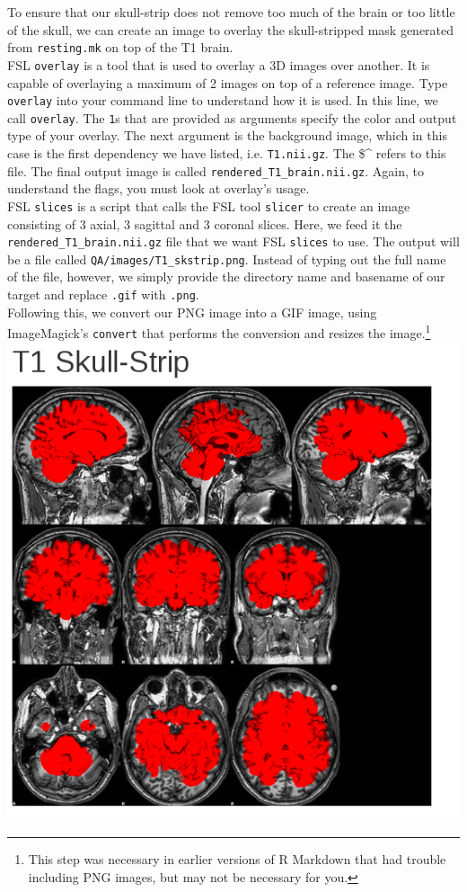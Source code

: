 To ensure that our skull-strip does not remove too much of the brain or too little of the skull, we can create an image to overlay the skull-stripped mask generated from \texttt{resting.mk} on top of the T1 brain. \\
\tab{} FSL \texttt{overlay} is a tool that is used to overlay a 3D images over another. It is capable of overlaying a maximum of 2 images on top of a reference image. Type \texttt{overlay} into your command line to understand how it is used. In this line, we call \texttt{overlay}. The \texttt{1}s that are provided as arguments specify the color and output type of your overlay. The next argument is the background image, which in this case is the first dependency we have listed, i.e. \texttt{T1.nii.gz}. The \$\textasciicircum{} refers to this file. The final output image is called \texttt{rendered\_T1\_brain.nii.gz}. Again, to understand the flags, you must look at overlay's usage. \\
 FSL \texttt{slices} is a script that calls the FSL tool \texttt{slicer} to create an image consisting of 3 axial, 3 sagittal and 3 coronal slices. Here, we feed it the \texttt{rendered\_T1\_brain.nii.gz} file that we want FSL \texttt{slices} to use. The output will be a file called \texttt{QA/images/T1\_skstrip.png}. Instead of typing out the full name of the file, however, we simply provide the directory name and basename of our target and replace \texttt{.gif} with \texttt{.png}. \\
 Following this, we convert our PNG image into a GIF image, using ImageMagick's \texttt{convert} that performs the conversion and resizes the image.\footnote{This step was necessary in earlier versions of R Markdown that had trouble including PNG images, but may not be necessary for you.}\\

\includegraphics[scale=0.4]{../images/QAskullstrip.png}


